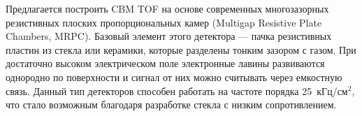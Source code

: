 
Предлагается построить CBM TOF на основе современных многозазорных резистивных плоских пропорциональных камер (Multigap Resistive Plate Chambers, MRPC). Базовый элемент этого детектора --- пачка резистивных пластин из стекла или керамики, которые разделены тонким зазором с газом. При достаточно высоком электрическом поле электронные лавины развиваются однородно по поверхности и сигнал от них можно считывать через емкостную связь.
Данный тип детекторов способен работать на частоте порядка 25~кГц/см$^2$, что стало возможным благодаря разработке стекла с низким сопротивлением.


